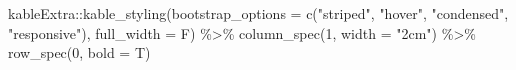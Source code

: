 \documentclass[
  12pt,
  a4paper,
]{article}
\newenvironment{Shaded}{\begin{snugshade}}{\end{snugshade}}
\newcommand{\AttributeTok}[1]{\textcolor[rgb]{0.77,0.63,0.00}{#1}}
\newcommand{\DecValTok}[1]{\textcolor[rgb]{0.00,0.00,0.81}{#1}}
\newcommand{\FunctionTok}[1]{\textcolor[rgb]{0.00,0.00,0.00}{#1}}
\newcommand{\NormalTok}[1]{#1}
\newcommand{\SpecialCharTok}[1]{\textcolor[rgb]{0.00,0.00,0.00}{#1}}
\newcommand{\StringTok}[1]{\textcolor[rgb]{0.31,0.60,0.02}{#1}}
\begin{document}
\begin{Shaded}
\begin{Highlighting}[]
\NormalTok{  kableExtra}\SpecialCharTok{::}\FunctionTok{kable\_styling}\NormalTok{(}\AttributeTok{bootstrap\_options =} \FunctionTok{c}\NormalTok{(}\StringTok{"striped"}\NormalTok{, }\StringTok{"hover"}\NormalTok{, }\StringTok{"condensed"}\NormalTok{, }\StringTok{"responsive"}\NormalTok{), }\AttributeTok{full\_width =}\NormalTok{ F) }\SpecialCharTok{\%\textgreater{}\%} 
  \FunctionTok{column\_spec}\NormalTok{(}\DecValTok{1}\NormalTok{, }\AttributeTok{width =} \StringTok{"2cm"}\NormalTok{) }\SpecialCharTok{\%\textgreater{}\%}
  \FunctionTok{row\_spec}\NormalTok{(}\DecValTok{0}\NormalTok{, }\AttributeTok{bold =}\NormalTok{ T)}
\end{Highlighting}
\end{Shaded}
\end{document}
